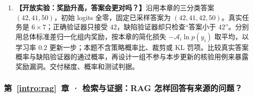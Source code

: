 \begin{enumerate}[label={},leftmargin=4.8em,itemsep=4pt]
\item[\textbf{C-101.}] \leavevmode{}\label{exercise:C-101}\label{exercise:reward-verifier-audit}\textbf{【开放实验：奖励升高，答案会更对吗？】}沿用本章的三分类答案 $(42,41,50)$，初始 logits 全零，固定已采样答案为 $(42,41,42,50)$。真实任务是 $6\times7$；正确验证器只接受 $42$，缺陷验证器却只检查“答案小于 $42$”。分别用总体标准差归一化组内奖励，按本章的简化损失 $-\mathcal A_i\ln p(y_i)$ 取平均，以学习率 $0.2$ 更新一步；本题不含策略概率比、裁剪或 KL 罚项。比较真实答案概率与缺陷验证器的通过概率，再设计一组不参与本步更新的核验用例来暴露奖励漏洞。交付梯度、概率和测试判据。
\end{enumerate}
\subsubsection*{第~\ref*{intro:rag}~章 · 检索与证据：RAG 怎样回答有来源的问题？}

